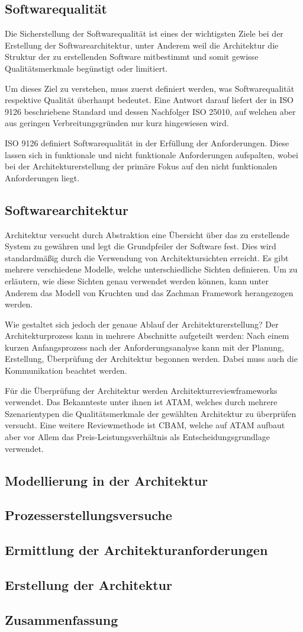 \subsection{Softwarequalität}
Die Sicherstellung der Softwarequalität ist eines der wichtigsten Ziele bei der Erstellung der Softwarearchitektur, unter Anderem weil die Architektur die Struktur der zu erstellenden Software mitbestimmt und somit gewisse Qualitätsmerkmale begünstigt oder limitiert.

Um dieses Ziel zu verstehen, muss zuerst definiert werden, was Softwarequalität respektive Qualität überhaupt bedeutet. Eine Antwort darauf liefert der in ISO 9126 beschriebene Standard und dessen Nachfolger ISO 25010, auf welchen aber aus geringen Verbreitungsgründen nur kurz hingewiesen wird.

ISO 9126 definiert Softwarequalität in der Erfüllung der Anforderungen. Diese lassen sich in funktionale und nicht funktionale Anforderungen aufspalten, wobei bei der Architekturerstellung der primäre Fokus auf den nicht funktionalen Anforderungen liegt.

\subsection{Softwarearchitektur}
Architektur versucht durch Abstraktion eine Übersicht über das zu erstellende System zu gewähren und legt die Grundpfeiler der Software fest. Dies wird standardmäßig durch die Verwendung von Architektursichten erreicht. Es gibt mehrere verschiedene Modelle, welche unterschiedliche Sichten definieren. Um zu erläutern, wie diese Sichten genau verwendet werden können, kann unter Anderem das Modell von Kruchten und das Zachman Framework herangezogen werden.

Wie gestaltet sich jedoch der genaue Ablauf der Architekturerstellung? Der Architekturprozess kann in mehrere Abschnitte aufgeteilt werden: Nach einem kurzen Anfangsprozess nach der Anforderungsanalyse kann mit der Planung, Erstellung, Überprüfung der Architektur begonnen werden. Dabei muss auch die Kommunikation beachtet werden.

Für die Überprüfung der Architektur werden Architekturreviewframeworks verwendet. Das Bekannteste unter ihnen ist ATAM, welches durch mehrere Szenarientypen die Qualitätsmerkmale der gewählten Architektur zu überprüfen versucht. Eine weitere Reviewmethode ist CBAM, welche auf ATAM aufbaut aber vor Allem das Preis-Leistungsverhältnis als Entscheidungsgrundlage verwendet.

\subsection{Modellierung in der Architektur}
\subsection{Prozesserstellungsversuche}
\subsection{Ermittlung der Architekturanforderungen}
\subsection{Erstellung der Architektur}
\subsection{Zusammenfassung}